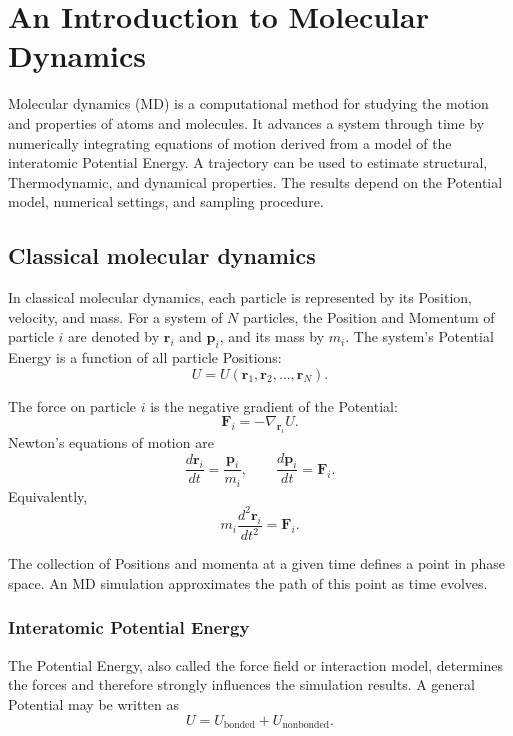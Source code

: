 \documentclass[a4paper, 10pt, onepage]{elegantbook}
\begin{document}
{\chapter{An Introduction to Molecular Dynamics}

Molecular dynamics (MD) is a computational method for studying the motion
and properties of atoms and molecules. It advances a system through time
by numerically integrating equations of motion derived from a model of the
interatomic Potential Energy. A trajectory can be used to estimate
structural, Thermodynamic, and dynamical properties. The results depend on
the Potential model, numerical settings, and sampling procedure.


\section{Classical molecular dynamics}

In classical molecular dynamics, each particle is represented by its
Position, velocity, and mass. For a system of \(N\) particles, the Position
and Momentum of particle \(i\) are denoted by \(\bm{r}_i\) and \(\bm{p}_i\),
and its mass by \(m_i\). The system's Potential Energy is a function of all
particle Positions:
\[
U = U(\bm{r}_1,\bm{r}_2,\ldots,\bm{r}_N).
\]

The force on particle \(i\) is the negative gradient of the Potential:
\[
\bm{F}_i = -\nabla_{\bm{r}_i} U.
\]
Newton's equations of motion are
\[
\frac{d\bm{r}_i}{dt} = \frac{\bm{p}_i}{m_i},
\qquad
\frac{d\bm{p}_i}{dt} = \bm{F}_i.
\]
Equivalently,
\[
m_i\frac{d^2\bm{r}_i}{dt^2} = \bm{F}_i.
\]

The collection of Positions and momenta at a given time defines a point
in phase space. An MD simulation approximates the path of this point as
time evolves.

\subsection{Interatomic Potential Energy}

The Potential Energy, also called the force field or interaction model,
determines the forces and therefore strongly influences the simulation
results. A general Potential may be written as
\[
U = U_{\mathrm{bonded}} + U_{\mathrm{nonbonded}}.
\]

}
\end{document}

